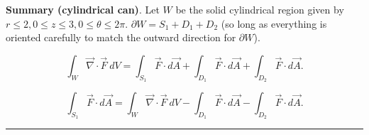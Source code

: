 \documentclass[12pt,letterpaper,noanswers]{exam}
\begin{document}
\noindent\textbf{Summary (cylindrical can)}.  Let $W$ be the solid cylindrical region given by $r\leq 2, 0\leq z\leq 3, 0\leq \theta\leq 2\pi$.  $\partial W = S_1+D_1+D_2$ (so long as everything is oriented carefully to match the outward direction for $\partial W$).

\[\displaystyle \int_W \vec\nabla\cdot\vec F\ dV = \int_{S_1}\vec F\cdot d\vec A + \int_{D_1}\vec F\cdot d\vec A + \int_{D_2}\vec F\cdot d\vec A.\]

\[\displaystyle  \int_{S_1}\vec F\cdot d\vec A = \int_W \vec\nabla\cdot\vec F\ dV - \int_{D_1}\vec F\cdot d\vec A - \int_{D_2}\vec F\cdot d\vec A.\]


\vspace{0.5cm}


\vspace{0.2cm}
\hrule
\vspace{0.2cm}


\end{document}

